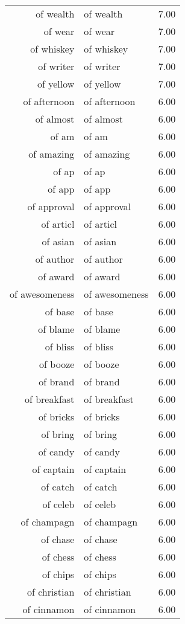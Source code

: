 \begin{table}[ht]
\begin{tabular}{rlr}
  of wealth & of wealth & 7.00 \\ 
  of wear & of wear & 7.00 \\ 
  of whiskey & of whiskey & 7.00 \\ 
  of writer & of writer & 7.00 \\ 
  of yellow & of yellow & 7.00 \\ 
  of afternoon & of afternoon & 6.00 \\ 
  of almost & of almost & 6.00 \\ 
  of am & of am & 6.00 \\ 
  of amazing & of amazing & 6.00 \\ 
  of ap & of ap & 6.00 \\ 
  of app & of app & 6.00 \\ 
  of approval & of approval & 6.00 \\ 
  of articl & of articl & 6.00 \\ 
  of asian & of asian & 6.00 \\ 
  of author & of author & 6.00 \\ 
  of award & of award & 6.00 \\ 
  of awesomeness & of awesomeness & 6.00 \\ 
  of base & of base & 6.00 \\ 
  of blame & of blame & 6.00 \\ 
  of bliss & of bliss & 6.00 \\ 
  of booze & of booze & 6.00 \\ 
  of brand & of brand & 6.00 \\ 
  of breakfast & of breakfast & 6.00 \\ 
  of bricks & of bricks & 6.00 \\ 
  of bring & of bring & 6.00 \\ 
  of candy & of candy & 6.00 \\ 
  of captain & of captain & 6.00 \\ 
  of catch & of catch & 6.00 \\ 
  of celeb & of celeb & 6.00 \\ 
  of champagn & of champagn & 6.00 \\ 
  of chase & of chase & 6.00 \\ 
  of chess & of chess & 6.00 \\ 
  of chips & of chips & 6.00 \\ 
  of christian & of christian & 6.00 \\ 
  of cinnamon & of cinnamon & 6.00 \\ 

\end{tabular}
\end{table}
